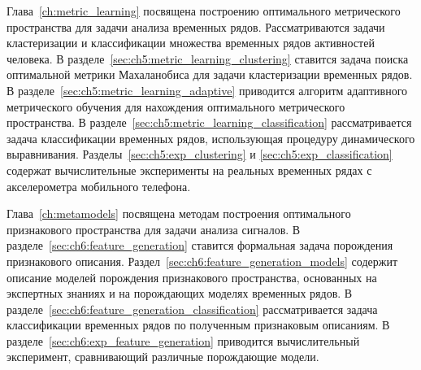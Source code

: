 Глава~\ref{ch:metric_learning} посвящена построению оптимального метрического пространства для задачи анализа временных рядов.
Рассматриваются задачи кластеризации и классификации множества временных рядов активностей человека.
В разделе~\ref{sec:ch5:metric_learning_clustering} ставится задача поиска оптимальной метрики Махаланобиса для задачи кластеризации временных рядов.
В разделе~\ref{sec:ch5:metric_learning_adaptive} приводится алгоритм адаптивного метрического обучения для нахождения оптимального метрического пространства.
В разделе~\ref{sec:ch5:metric_learning_classification} рассматривается задача классификации временных рядов, использующая процедуру динамического выравнивания. 
Разделы~\ref{sec:ch5:exp_clustering} и \ref{sec:ch5:exp_classification} содержат вычислительные эксперименты на реальных временных рядах с акселерометра мобильного телефона.

Глава~\ref{ch:metamodels} посвящена методам построения оптимального признакового пространства для задачи анализа сигналов. 
В разделе~\ref{sec:ch6:feature_generation} ставится формальная задача порождения признакового описания.
Раздел~\ref{sec:ch6:feature_generation_models} содержит описание моделей порождения признакового пространства, основанных на экспертных знаниях и на порождающих моделях временных рядов.
В разделе~\ref{sec:ch6:feature_generation_classification} рассматривается задача классификации временных рядов по полученным признаковым описаниям.
В разделе~\ref{sec:ch6:exp_feature_generation} приводится вычислительный эксперимент, сравнивающий различные порождающие модели.